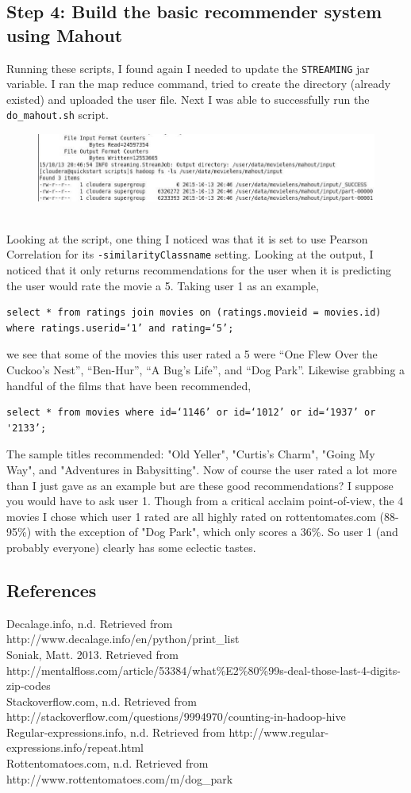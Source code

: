 \documentclass[10pt]{article}
\begin{document}
\subsection*{Step 4: Build the basic recommender system using Mahout}
Running these scripts, I found again I needed to update the \verb|STREAMING| jar variable. I ran the map reduce command, tried to create the directory (already existed) and uploaded the user file. Next I was able to successfully run the \verb|do_mahout.sh| script. 
\begin{figure}[!h]
\includegraphics[scale=0.45]{mahout_mapreduce.jpg}
\centering
\end{figure}\\
Looking at the script, one thing I noticed was that it is set to use Pearson Correlation for its \verb|-similarityClassname| setting. Looking at the output, I noticed that it only returns recommendations for the user when it is predicting the user would rate the movie a 5. Taking user 1 as an example, 
\begin{verbatim}select * from ratings join movies on (ratings.movieid = movies.id) 
where ratings.userid=‘1’ and rating=‘5’;\end{verbatim} we see that some of the movies this user rated a 5 were “One Flew Over the Cuckoo’s Nest”, “Ben-Hur”, “A Bug’s Life”, and “Dog Park”.  Likewise grabbing a handful of the films that have been recommended, 
\begin{verbatim}select * from movies where id=‘1146’ or id=‘1012’ or id=‘1937’ or '2133’;\end{verbatim} The sample titles recommended: "Old Yeller", "Curtis's Charm", "Going My Way", and "Adventures in Babysitting". Now of course the user rated a lot more than I just gave as an example but are these good recommendations? I suppose you would have to ask user 1. Though from a critical acclaim point-of-view, the 4 movies I chose which user 1 rated are all highly rated on rottentomates.com (88-95\%) with the exception of "Dog Park", which only scores a 36\%. So user 1 (and probably everyone) clearly has some eclectic tastes.
\subsection*{References}
Decalage.info, n.d. Retrieved from http://www.decalage.info/en/python/print\_list\\
Soniak, Matt. 2013. Retrieved from http://mentalfloss.com/article/53384/what\%E2\%80\%99s-deal-those-last-4-digits-zip-codes\\
Stackoverflow.com, n.d. Retrieved from http://stackoverflow.com/questions/9994970/counting-in-hadoop-hive\\
Regular-expressions.info, n.d. Retrieved from http://www.regular-expressions.info/repeat.html\\
Rottentomatoes.com, n.d. Retrieved from http://www.rottentomatoes.com/m/dog\_park
\end{document}
